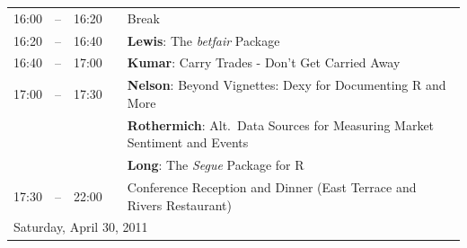 \documentclass[10pt]{article}
\newcommand{\mylinecolor}[1]{\color{#1}\vspace{-8pt}}  %
\begin{document}
\begin{tabular}{rlrlp{5in}}
  16:00 & -- & 16:20 &    & \small{\mylinecolor{Breaks} Break} \\
  16:20 & -- & 16:40 &    & \textbf{\color{Talk} Lewis}: \small{The \emph{betfair} Package} \\
  16:40 & -- & 17:00 &    & \textbf{\color{Talk} Kumar}: \small{Carry Trades - Don't Get Carried Away} \\
  17:00 & -- & 17:30 &    & \textbf{\color{LightningTalk} Nelson}: \small{Beyond Vignettes: Dexy for Documenting R and More} \\
         &    &        &    & \textbf{\color{LightningTalk}  Rothermich}: \small{Alt.~Data Sources for Measuring Market Sentiment and Events} \\
         &    &        &    & \textbf{\color{LightningTalk} Long}: \small{The \emph{Segue} Package for R} \\
  17:30 & -- & 22:00 &    & \small{\mylinecolor{Breaks} Conference Reception and Dinner (East Terrace and Rivers Restaurant)}  \\[18pt]

  \multicolumn{5}{l}{\large Saturday, April 30, 2011} \\[10pt]


\end{tabular}
\end{document}
